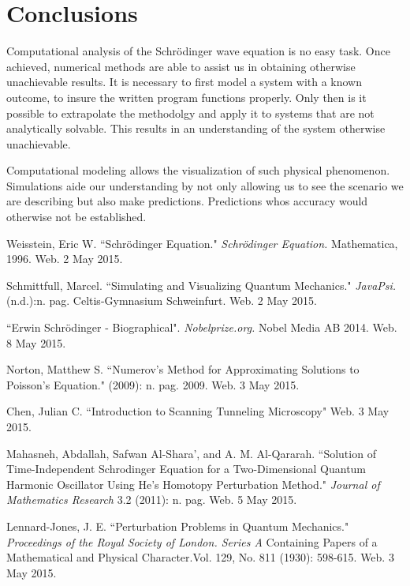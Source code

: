 \documentclass[aps,prl,twocolumn,superscriptaddress]{revtex4-1}
\begin{document}
\section{Conclusions}

Computational analysis of the Schr\"{o}dinger wave equation is no easy task.  Once achieved, numerical methods are able to 
assist us in obtaining otherwise unachievable results.  It is necessary to first model a system with a known outcome, to 
insure the written program functions properly.  Only then is it possible to extrapolate the methodolgy and apply it to 
systems that are not analytically solvable.  This results in an understanding of the system otherwise unachievable.

Computational modeling allows the visualization of such physical phenomenon.  Simulations aide our understanding by not only allowing us to 
see the scenario we are describing but also make predictions.  Predictions whos accuracy would otherwise not be established.



\setlength{\parindent}{0cm}

\begin{thebibliography}{99}  %

 Weisstein, Eric W. ``Schr\"{o}dinger Equation."
{\em Schr\"{o}dinger Equation. } Mathematica, 1996. Web. 2 May 2015.

 Schmittfull, Marcel. ``Simulating and Visualizing Quantum Mechanics."
{\em JavaPsi. } (n.d.):n. pag. Celtis-Gymnasium Schweinfurt. Web. 2 May 2015.

 ``Erwin Schrödinger - Biographical". {\em Nobelprize.org. } Nobel Media AB 2014. Web. 8 May 2015.

 Norton, Matthew S. ``Numerov's Method for Approximating Solutions to Poisson's Equation." (2009): n. pag. 2009. Web. 3 May 2015.

 Chen, Julian C. ``Introduction to Scanning Tunneling Microscopy" Web. 3 May 2015.

 Mahasneh, Abdallah, Safwan Al-Shara', and A. M. Al-Qararah. 
    ``Solution of Time-Independent Schrodinger Equation for a Two-Dimensional Quantum Harmonic Oscillator 
    Using He's Homotopy Perturbation Method." {\em Journal of Mathematics Research} 3.2 (2011): n. pag. Web. 5 May 2015. 

 Lennard-Jones, J. E. ``Perturbation Problems in Quantum Mechanics." {\em Proceedings of the Royal Society of London. 
      Series A} Containing Papers of a Mathematical and Physical Character.Vol. 129, No. 811 (1930): 598-615. Web. 3 May 2015. 

\end{thebibliography}
\end{document}
